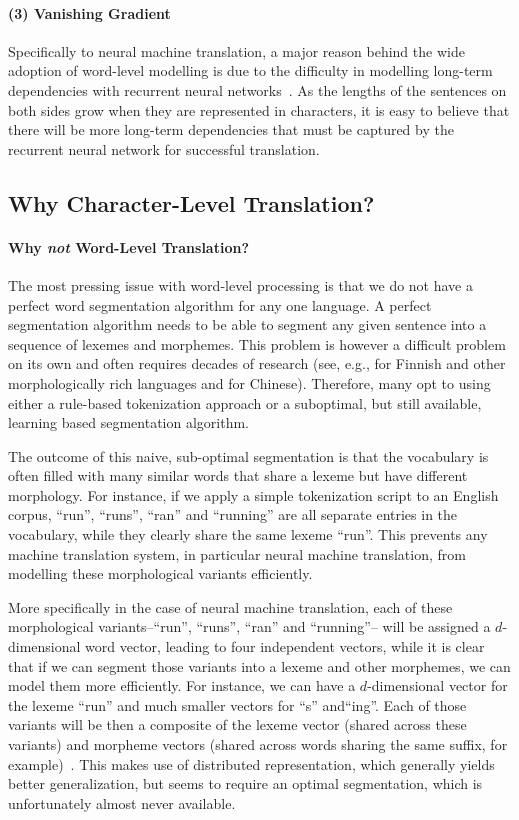 \documentclass[11pt]{article}
\begin{document}
\paragraph{(3) Vanishing Gradient}
Specifically to neural machine translation, a major reason behind the wide
adoption of word-level modelling is due to the difficulty in modelling long-term
dependencies with recurrent neural
networks~\cite{bengio1994learning,hochreiter1998vanishing}. As the lengths of
the sentences on both sides grow 
when they are represented in characters, it is easy to believe that there will
be more long-term dependencies that must be captured by the recurrent neural
network for successful translation. 

\subsection{Why Character-Level Translation?}

\paragraph{Why {\it not} Word-Level Translation?}
The most pressing issue with word-level processing is that we do not have a
perfect word segmentation algorithm for any one language. A perfect segmentation
algorithm needs to be able to segment any given sentence into a sequence of
lexemes and morphemes. This problem is however a difficult problem on its own
and often requires decades of research (see, e.g., 
for Finnish and other morphologically rich languages and 
for Chinese). Therefore, many opt to using either a rule-based tokenization
approach or a suboptimal, but still available, learning based
segmentation algorithm. 

The outcome of this naive, sub-optimal segmentation is that the vocabulary is
often filled with many similar words that share a lexeme but have different
morphology. For instance, if we apply a simple tokenization script to an English
corpus, ``run'', ``runs'', ``ran'' and ``running'' are all separate entries in
the vocabulary, while they clearly share the same lexeme ``run''. This prevents
any machine translation system, in particular neural machine translation, from
modelling these morphological variants efficiently. 

More specifically in the case of neural machine translation, each of these
morphological variants--``run'', ``runs'', ``ran'' and ``running''-- will be
assigned a $d$-dimensional word vector, leading to four independent vectors,
while it is clear that if we can segment those variants into a lexeme and other
morphemes, we can model them more efficiently. For instance, we can have a
$d$-dimensional vector for the lexeme ``run'' and much smaller vectors for ``s''
and``ing''.  Each of those variants will be then a composite of the lexeme
vector (shared across these variants) and morpheme vectors
(shared across words sharing the same suffix, for example)~\cite{botha2014compositional}. This
makes use of distributed representation, which generally yields better generalization, but seems
to require an optimal segmentation, which is unfortunately almost never available.
\end{document}

